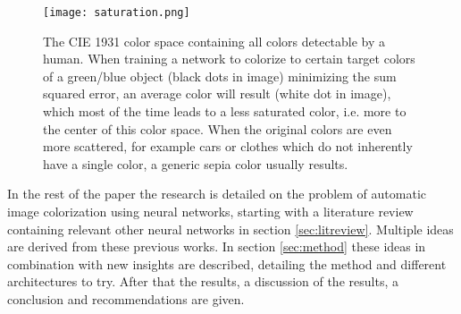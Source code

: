 \begin{wrapfigure}{r}{0.37\textwidth}
	\vspace{-20pt}
	\begin{center}
		\texttt{[image: saturation.png]}
	\end{center}
	\caption{\label{fig:colorspacesaturation} The CIE 1931 color space containing all colors detectable by a human. When training a network to colorize to certain target colors of a green/blue object (black dots in image) minimizing the sum squared error, an average color will result (white dot in image), which most of the time leads to a less saturated color, i.e. more to the center of this color space. When the original colors are even more scattered, for example cars or clothes which do not inherently have a single color, a generic sepia color usually results.}
\end{wrapfigure}
	
In the rest of the paper the research is detailed on the problem of automatic image colorization using neural networks, starting with a literature review containing relevant other neural networks in section \ref{sec:litreview}. Multiple ideas are derived from these previous works. In section \ref{sec:method} these ideas in combination with new insights are described, detailing the method and different architectures to try. After that the results, a discussion of the results, a conclusion and recommendations are given.
\newpage
	
	




